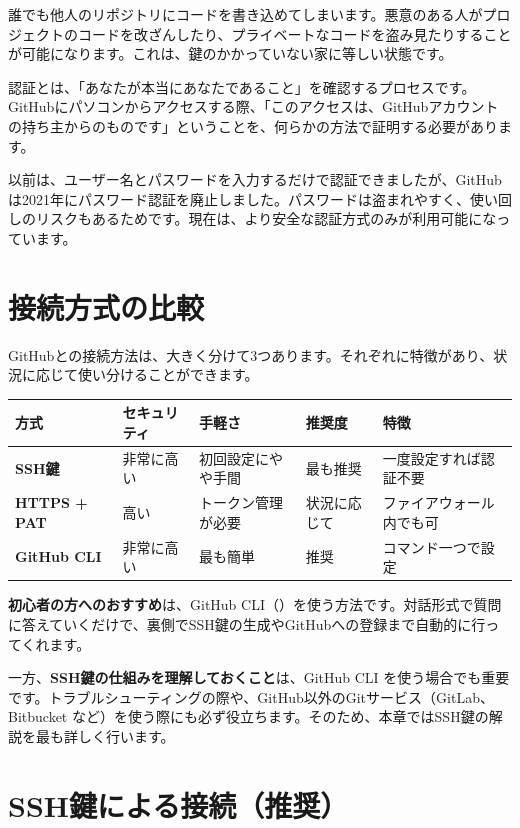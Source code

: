 誰でも他人のリポジトリにコードを書き込めてしまいます。悪意のある人がプロジェクトのコードを改ざんしたり、プライベートなコードを盗み見たりすることが可能になります。これは、鍵のかかっていない家に等しい状態です。

認証とは、「あなたが本当にあなたであること」を確認するプロセスです。GitHubにパソコンからアクセスする際、「このアクセスは、GitHubアカウント  の持ち主からのものです」ということを、何らかの方法で証明する必要があります。

以前は、ユーザー名とパスワードを入力するだけで認証できましたが、GitHubは2021年にパスワード認証を廃止しました。パスワードは盗まれやすく、使い回しのリスクもあるためです。現在は、より安全な認証方式のみが利用可能になっています。

\section{接続方式の比較}

GitHubとの接続方法は、大きく分けて3つあります。それぞれに特徴があり、状況に応じて使い分けることができます。

\begin{table}[htbp]
\centering
\begin{tabular}{lllll}
\hline
\textbf{方式} & \textbf{セキュリティ} & \textbf{手軽さ} & \textbf{推奨度} & \textbf{特徴} \\
\hline
\textbf{SSH鍵} & 非常に高い & 初回設定にやや手間 & 最も推奨 & 一度設定すれば認証不要 \\
\textbf{HTTPS + PAT} & 高い & トークン管理が必要 & 状況に応じて & ファイアウォール内でも可 \\
\textbf{GitHub CLI} & 非常に高い & 最も簡単 & 推奨 & コマンド一つで設定 \\
\hline
\end{tabular}
\end{table}

\textbf{初心者の方へのおすすめ}は、GitHub CLI（）を使う方法です。対話形式で質問に答えていくだけで、裏側でSSH鍵の生成やGitHubへの登録まで自動的に行ってくれます。

一方、\textbf{SSH鍵の仕組みを理解しておくこと}は、GitHub CLI を使う場合でも重要です。トラブルシューティングの際や、GitHub以外のGitサービス（GitLab、Bitbucket など）を使う際にも必ず役立ちます。そのため、本章ではSSH鍵の解説を最も詳しく行います。

\section{SSH鍵による接続（推奨）}

